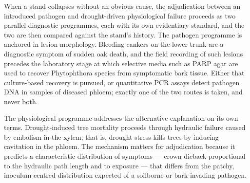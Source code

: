 \documentclass[11pt]{article}
\begin{document}
{When a stand collapses without an obvious cause, the adjudication between an introduced pathogen and drought-driven physiological failure proceeds as two parallel diagnostic programmes, each with its own evidentiary standard, and the two are then compared against the stand's history. The pathogen programme is anchored in lesion morphology. Bleeding cankers on the lower trunk are a diagnostic symptom of sudden oak death, and the field recording of such lesions precedes the laboratory stage at which selective media such as PARP agar are used to recover Phytophthora species from symptomatic bark tissue. Either that culture-based recovery is pursued, or quantitative PCR assays detect pathogen DNA in samples of diseased phloem; exactly one of the two routes is taken, and never both.

The physiological programme addresses the alternative explanation on its own terms. Drought-induced tree mortality proceeds through hydraulic failure caused by embolism in the xylem; that is, drought stress kills trees by inducing cavitation in the phloem. The mechanism matters for adjudication because it predicts a characteristic distribution of symptoms — crown dieback proportional to the hydraulic path length and to exposure — that differs from the patchy, inoculum-centred distribution expected of a soilborne or bark-invading pathogen.}
\end{document}
